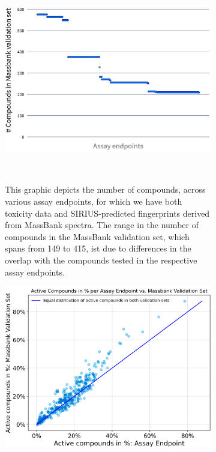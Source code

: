 \begin{enumerate}
    \begin{figure}[h]
        \centering
        \begin{subfigure}[b]{0.48\textwidth}
            \centering
            \includegraphics[width=\textwidth]{figures/Massbank_overlap.png}
            \caption{This graphic depicts the number of compounds, across various assay endpoints, for which we have both toxicity data and SIRIUS-predicted fingerprints derived from MassBank spectra. The range in the number of compounds in the MassBank validation set, which spans from 149 to 415, ist due to differences in the overlap with the compounds tested in the respective assay endpoints.}
        ~\label{fig:MassBank_overlap}
        \end{subfigure}
        \hfill
        \begin{subfigure}[b]{0.48\textwidth}
            \centering
            \includegraphics[width=\textwidth]{figures/activity_ratio_comparison.png}

\end{subfigure}
\end{figure}
\end{enumerate}

